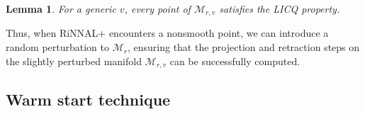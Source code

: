 \documentclass[11pt]{article}
\theoremstyle{plain}
\newtheorem{lemma}{Lemma}
\def\M{\mathcal{M}}
\begin{document}
\begin{lemma}{\cite[Theorem 4]{tang2023feasible}}
    For a generic $v$, every point of $\M_{r,v}$ satisfies the LICQ property.
\end{lemma}

Thus, when RiNNAL+ encounters a nonsmooth point, we can introduce a random perturbation to $\M_r$, ensuring that the projection and retraction steps on the 
slightly perturbed manifold $\M_{r,v}$ can be successfully computed.


\subsection{Warm start technique}\label{subsec-recover-dual}
\end{document}
